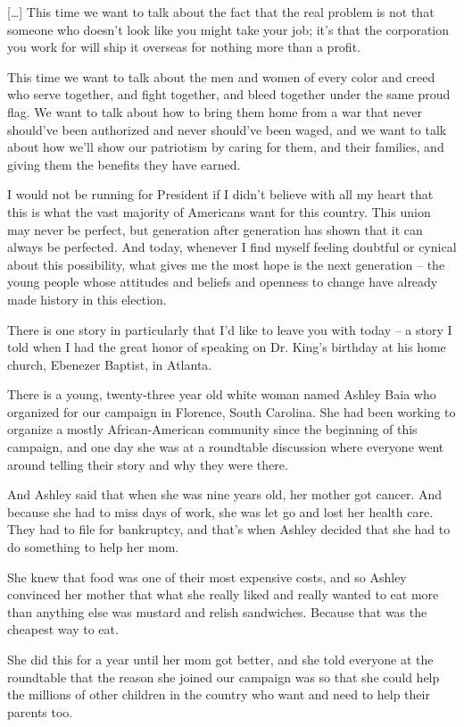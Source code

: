 \documentclass[10pt,a4paper]{article}
\begin{document}
[…]  This time we want to talk about the fact that the real problem is not that someone who doesn’t look like you might take your job; it’s that the corporation you work for will ship it overseas for nothing more than a profit. 

This time we want to talk about the men and women of every color and creed who serve together, and fight together, and bleed together under the same proud flag. We want to talk about how to bring them home from a war that never should’ve been authorized and never should’ve been waged, and we want to talk about how we’ll show our patriotism by caring for them, and their families, and giving them the benefits they have earned. 

I would not be running for President if I didn’t believe with all my heart that this is what the vast majority of Americans want for this country. This union may never be perfect, but generation after generation has shown that it can always be perfected. And today, whenever I find myself feeling doubtful or cynical about this possibility, what gives me the most hope is the next generation – the young people whose attitudes and beliefs and openness to change have already made history in this election. 

There is one story in particularly that I’d like to leave you with today – a story I told when I had the great honor of speaking on Dr. King’s birthday at his home church, Ebenezer Baptist, in Atlanta. 

There is a young, twenty-three year old white woman named Ashley Baia who organized for our campaign in Florence, South Carolina. She had been working to organize a mostly African-American community since the beginning of this campaign, and one day she was at a roundtable discussion where everyone went around telling their story and why they were there. 

And Ashley said that when she was nine years old, her mother got cancer. And because she had to miss days of work, she was let go and lost her health care. They had to file for bankruptcy, and that’s when Ashley decided that she had to do something to help her mom.

She knew that food was one of their most expensive costs, and so Ashley convinced her mother that what she really liked and really wanted to eat more than anything else was mustard and relish sandwiches. Because that was the cheapest way to eat. 

She did this for a year until her mom got better, and she told everyone at the roundtable that the reason she joined our campaign was so that she could help the millions of other children in the country who want and need to help their parents too.
\end{document}
